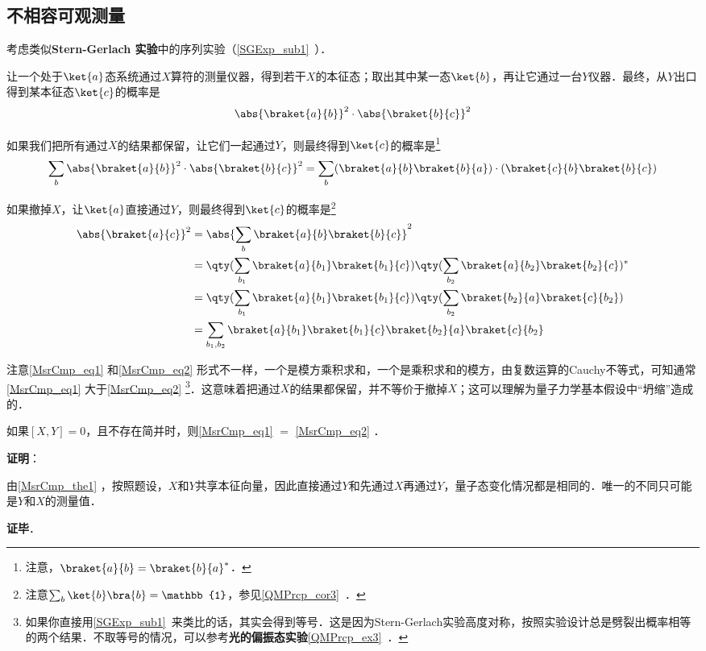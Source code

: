 \subsection{不相容可观测量}


考虑类似\textbf{Stern-Gerlach 实验}中的序列实验（\autoref{SGExp_sub1}~）．

让一个处于$\ket{a}$态系统通过$X$算符的测量仪器，得到若干$X$的本征态；取出其中某一态$\ket{b}$，再让它通过一台$Y$仪器．最终，从$Y$出口得到某本征态$\ket{c}$的概率是
\begin{equation}
\abs{\braket{a}{b}}^2\cdot\abs{\braket{b}{c}}^2
\end{equation}

如果我们把所有通过$X$的结果都保留，让它们一起通过$Y$，则最终得到$\ket{c}$的概率是\footnote{注意，$\braket{a}{b}=\braket{b}{a}^*$．}
\begin{equation}\label{MsrCmp_eq1}
\sum_{b}\abs{\braket{a}{b}}^2\cdot\abs{\braket{b}{c}}^2=\sum_{b}(\braket{a}{b}\braket{b}{a})\cdot(\braket{c}{b}\braket{b}{c})
\end{equation}

如果撤掉$X$，让$\ket{a}$直接通过$Y$，则最终得到$\ket{c}$的概率是\footnote{注意$\sum_{b}\ket{b}\bra{b}=\mathbb{1}$，参见\autoref{QMPrcp_cor3}~．}
\begin{equation}\label{MsrCmp_eq2}
\begin{aligned}
\abs{\braket{a}{c}}^2&=\abs{\sum_{b}\braket{a}{b}\braket{b}{c}}^2\\
&=\qty(\sum_{b_1}\braket{a}{b_1}\braket{b_1}{c})\qty(\sum_{b_2}\braket{a}{b_2}\braket{b_2}{c})^*\\
&=\qty(\sum_{b_1}\braket{a}{b_1}\braket{b_1}{c})\qty(\sum_{b_2}\braket{b_2}{a}\braket{c}{b_2})\\
&=\sum_{b_1, b_2}\braket{a}{b_1}\braket{b_1}{c}\braket{b_2}{a}\braket{c}{b_2}
\end{aligned}
\end{equation}

注意\autoref{MsrCmp_eq1} 和\autoref{MsrCmp_eq2} 形式不一样，一个是模方乘积求和，一个是乘积求和的模方，由复数运算的Cauchy不等式，可知通常\autoref{MsrCmp_eq1} 大于\autoref{MsrCmp_eq2} \footnote{如果你直接用\autoref{SGExp_sub1}~来类比的话，其实会得到等号．这是因为Stern-Gerlach实验高度对称，按照实验设计总是劈裂出概率相等的两个结果．不取等号的情况，可以参考\textbf{光的偏振态实验}\autoref{QMPrcp_ex3}~．}．这意味着把通过$X$的结果都保留，并不等价于撤掉$X$；这可以理解为量子力学基本假设中“坍缩”造成的．

\begin{theorem}{}
如果$[X, Y]=0$，且不存在简并时，则\autoref{MsrCmp_eq1} $=$ \autoref{MsrCmp_eq2} ．
\end{theorem}

\textbf{证明}：

由\autoref{MsrCmp_the1} ，按照题设，$X$和$Y$共享本征向量，因此直接通过$Y$和先通过$X$再通过$Y$，量子态变化情况都是相同的．唯一的不同只可能是$Y$和$X$的测量值．

\textbf{证毕}．
















